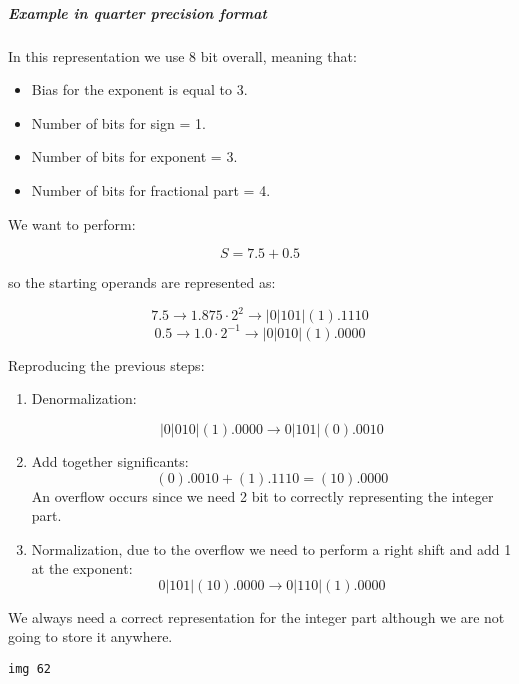 \subparagraph{Example in quarter precision format}

In this representation we use 8 bit overall, meaning that:

\begin{itemize}
  \item Bias for the exponent is equal to 3.
  \item Number of bits for sign = 1.
  \item Number of bits for exponent = 3.
  \item Number of bits for fractional part = 4.
\end{itemize}

We want to perform:

$$S= 7.5 + 0.5$$

so the starting operands are represented as:

$$7.5 \longrightarrow 1.875 \cdot 2^2 \longrightarrow |0|101|(1).1110$$
$$0.5 \longrightarrow 1.0  \cdot 2^{-1} \longrightarrow  |0|010|(1).0000$$

Reproducing the previous steps:

\begin{enumerate}
\item Denormalization:

  $$|0|010|(1).0000 \rightarrow 0|101|(0).0010 $$

\item Add together significants:
  $$(0).0010 + (1).1110 = (10).0000$$
  An overflow occurs since we need 2 bit to correctly representing the
  integer part.

\item Normalization, due to the overflow we need to perform a right shift and
add 1 at the exponent:
  $$ 0|101|(10).0000 \rightarrow 0|110|(1).0000$$
\end{enumerate}

We always need a correct representation for the integer part although we are
not going to store it anywhere.

\begin{verbatim}
img 62

























\end{verbatim}

